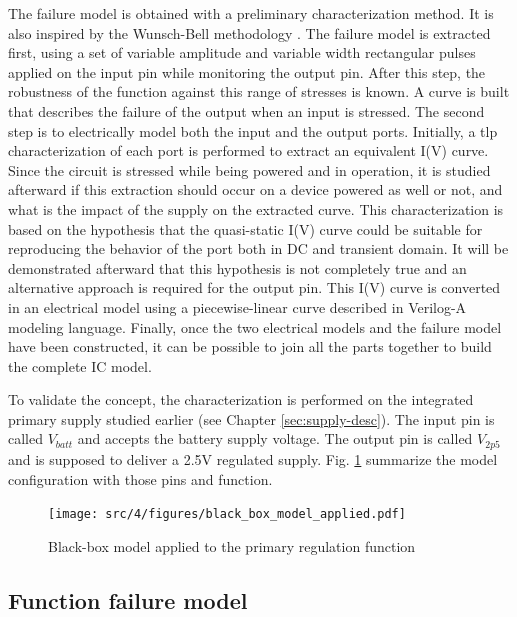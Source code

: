 The failure model is obtained with a preliminary characterization method.
It is also inspired by the Wunsch-Bell methodology \cite{wunsch-bell}.
The failure model is extracted first, using a set of variable amplitude and variable width rectangular pulses applied on the input pin while monitoring the output pin.
After this step, the robustness of the function against this range of stresses is known.
A curve is built that describes the failure of the output when an input is stressed.
The second step is to electrically model both the input and the output ports.
Initially, a \gls{tlp} characterization of each port is performed to extract an equivalent I(V) curve.
Since the circuit is stressed while being powered and in operation, it is studied afterward if this extraction should occur on a device powered as well or not, and what is the impact of the supply on the extracted curve.
This characterization is based on the hypothesis that the quasi-static I(V) curve could be suitable for reproducing the behavior of the port both in DC and transient domain.
It will be demonstrated afterward that this hypothesis is not completely true and an alternative approach is required for the output pin.
This I(V) curve is converted in an electrical model using a piecewise-linear curve described in Verilog-A modeling language.
Finally, once the two electrical models and the failure model have been constructed, it can be possible to join all the parts together to build the complete IC model.

To validate the concept, the characterization is performed on the integrated primary supply studied earlier (see Chapter \ref{sec:supply-desc}).
The input pin is called $V_{batt}$ and accepts the battery supply voltage.
The output pin is called $V_{2p5}$ and is supposed to deliver a 2.5V regulated supply.
Fig. \ref{fig:black-box-applied} summarize the model configuration with those pins and function.

\begin{figure}[!h]
  \centering
  \texttt{[image: src/4/figures/black\_box\_model\_applied.pdf]}
  \caption{Black-box model applied to the primary regulation function}
  \label{fig:black-box-applied}
\end{figure}


\subsection{Function failure model}

